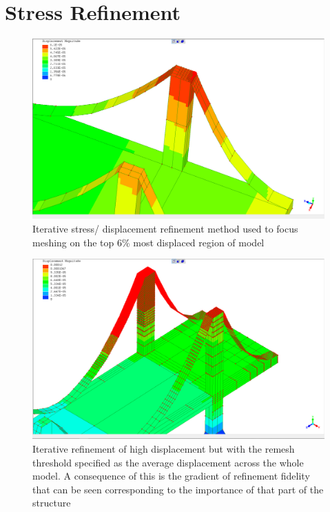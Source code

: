 \section{Stress Refinement}
\begin{figure}[H]
  \centerline{\includegraphics[width=165mm, scale=0.5]{../Graphics/BridgeCrossLoading/the90thPercentileRefinement.png}}
  \caption{Iterative stress/ displacement refinement method used to focus meshing on the top 6\% most displaced region of model}
\end{figure}

\begin{figure}[H]
  \centerline{\includegraphics[width=165mm, scale=0.5]{../Graphics/BridgeCrossLoading/aboveAverageRefinement2.png}}
  \caption{Iterative refinement of high displacement but with the remesh threshold specified as the average displacement across the whole model. A consequence of this is the gradient of refinement fidelity that can be seen corresponding to the importance of that part of the structure}
\end{figure}


